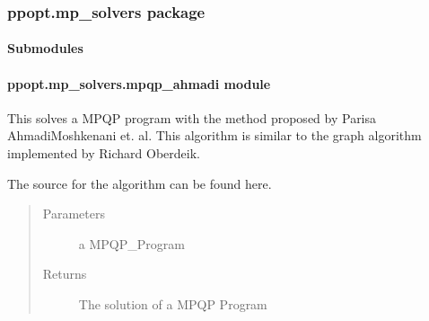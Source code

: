 \documentclass[letterpaper,10pt,english]{sphinxmanual}
\begin{document}
\subsubsection{ppopt.mp\_solvers package}
\label{\detokenize{ppopt.mp_solvers:ppopt-mp-solvers-package}}\label{\detokenize{ppopt.mp_solvers::doc}}

\paragraph{Submodules}
\label{\detokenize{ppopt.mp_solvers:submodules}}

\paragraph{ppopt.mp\_solvers.mpqp\_ahmadi module}
\label{\detokenize{ppopt.mp_solvers:module-ppopt.mp_solvers.mpqp_ahmadi}}\label{\detokenize{ppopt.mp_solvers:ppopt-mp-solvers-mpqp-ahmadi-module}}

\begin{fulllineitems}
\label{\detokenize{ppopt.mp_solvers:ppopt.mp_solvers.mpqp_ahmadi.solve}}
\sphinxAtStartPar
This solves a MPQP program with the method proposed by Parisa Ahmadi\sphinxhyphen{}Moshkenani et. al. This algorithm is similar to the graph algorithm implemented by Richard Oberdeik.

\sphinxAtStartPar
The source for the algorithm can be found here. 
\begin{quote}\begin{description}
\item[{Parameters}] \leavevmode
\sphinxAtStartPar
{} \textendash{} a MPQP\_Program

\item[{Returns}] \leavevmode
\sphinxAtStartPar
The solution of a MPQP Program

\end{description}\end{quote}

\end{fulllineitems}
\end{document}
